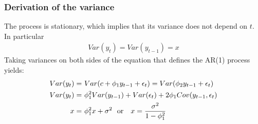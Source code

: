 \documentclass[a4paper,twoside,11pt]{article}
\begin{document}
\subsubsection{Derivation of the variance}
The process is stationary, which implies that its variance does not depend on $t$. In particular
\begin{equation*}
\begin{aligned}
Var(y_t) =Var(y_{t-1})=x
\end{aligned}
\end{equation*}
Taking variances on both sides of the equation that defines the AR(1)
process yields:
\begin{equation*}
\begin{aligned}
Var(y_t) =& \ Var(c+ \phi_1 y_{t-1} + \epsilon_t) = Var(\phi_2 y_{t-1} + \epsilon_t) \\
Var(y_t) =& \ \phi_1^2 Var(y_{t-1}) + Var(\epsilon_t) + 2\phi_1 Cov(y_{t-1}, \epsilon_t) \\
x =& \ \phi_1^2x + \sigma^2 \ \ \textmd{or} \ \ \ x = \frac{\sigma^2}{1-\phi_1^2}
\end{aligned}
\end{equation*}
\end{document}
